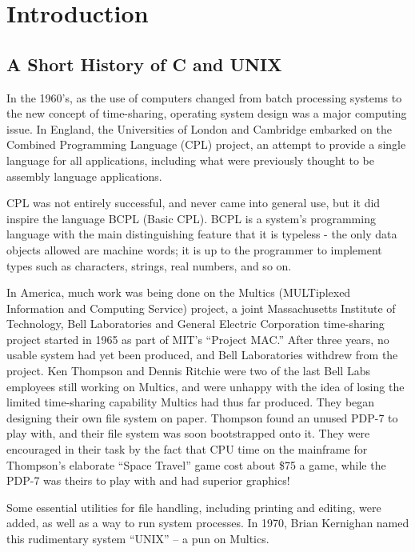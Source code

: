 \chapter{Introduction}

\section{A Short History of C and UNIX}

   In the 1960's, as the use of computers changed from batch
processing systems to the new concept of time-sharing, operating
system design was a major computing issue. In England, the
Universities of London and Cambridge embarked on the Combined
Programming Language (CPL) project, an attempt to provide a single
language for all applications, including what were previously thought
to be assembly language applications.

   CPL was not entirely successful, and never came into general use,
but it did inspire the language BCPL (Basic CPL). BCPL is a system's
programming language with the main distinguishing feature that it is
typeless - the only data objects allowed are machine words; it is up
to the programmer to implement types such as characters, strings,
real numbers, and so on.

   In America, much work was being done on the Multics (MULTiplexed
Information and Computing Service) project, a joint Massachusetts
Institute of Technology, Bell Laboratories and General Electric
Corporation time-sharing project started in 1965 as part of MIT's
``Project MAC.'' After three years, no usable system had yet been
produced, and Bell Laboratories withdrew from the project. Ken
Thompson and Dennis Ritchie were two of the last Bell Labs employees
still working on Multics, and were unhappy with the idea of losing
the limited time-sharing capability Multics had thus far produced.
They began designing their own file system on paper. Thompson found
an unused PDP-7 to play with, and their file system was soon
bootstrapped onto it. They were encouraged in their task by the fact
that CPU time on the mainframe for Thompson's elaborate ``Space
Travel'' game cost about \$75 a game, while the PDP-7 was theirs to
play with and had superior graphics!

   Some essential utilities for file handling, including printing and
editing, were added, as well as a way to run system processes. In 1970,
Brian Kernighan named this rudimentary system ``UNIX'' --  a pun on
Multics.

